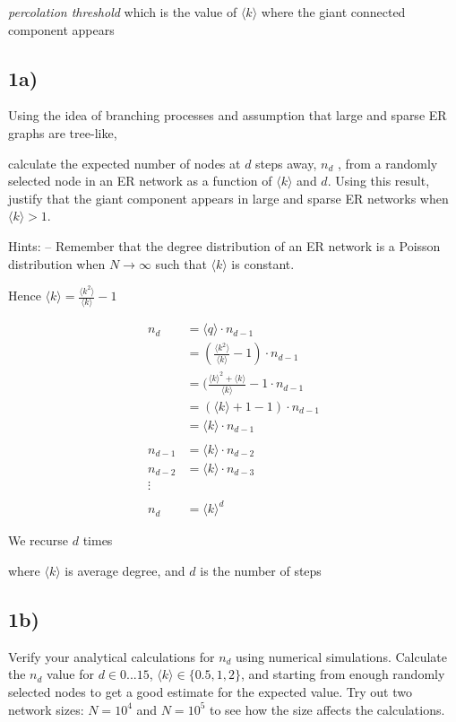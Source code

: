 \documentclass[11pt]{article}
\begin{document}
\emph{percolation threshold} which is the value of \(\langle k \rangle\)
where the giant connected component appears

    \subsection{1a)}\label{a}

Using the idea of branching processes and assumption that large and
sparse ER graphs are tree-like,

calculate the expected number of nodes at \(d\) steps away, \(n_d\) ,
from a randomly selected node in an ER network as a function of
\(\langle k \rangle\) and \(d\). Using this result, justify that the
giant component appears in large and sparse ER networks when
\(\langle k \rangle > 1\).

Hints: -- Remember that the degree distribution of an ER network is a
Poisson distribution when \(N \rightarrow \infty\) such that
\(\langle k \rangle\) is constant.

Hence
\(\langle k \rangle = \frac{\langle k^2 \rangle}{\langle k \rangle} - 1\)

    \[\begin{aligned}
n_d & = \langle q \rangle \cdot n_{d-1}\\
& = (\frac{\langle k^2 \rangle}{\langle k \rangle} - 1) \cdot n_{d-1}\\
& = (\frac{\langle k \rangle^2 + \langle k \rangle}{\langle k \rangle} - 1 \cdot n_{d-1}\\
& =  (\langle k \rangle + 1 -1 )\cdot n_{d-1}\\
& =  \langle k \rangle\cdot n_{d-1}
\\\\
n_{d-1} & = \langle k \rangle\cdot n_{d-2}\\
n_{d-2} & = \langle k \rangle\cdot n_{d-3}\\
\vdots &\\\\
n_d & = \langle k \rangle^d
\end{aligned}
\]

We recurse \(d\) times

where \(\langle k \rangle\) is average degree, and \(d\) is the number
of steps

    \subsection{1b)}\label{b}

Verify your analytical calculations for \(n_d\) using numerical
simulations. Calculate the \(n_d\) value for \(d \in {0 . . . 15}\),
\(\langle k \rangle \in \{0.5, 1, 2\}\), and starting from enough
randomly selected nodes to get a good estimate for the expected value.
Try out two network sizes: \(N = 10^4\) and \(N = 10^5\) to see how the
size affects the calculations.
\end{document}
